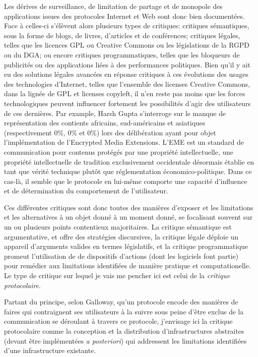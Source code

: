 \documentclass{article}
\begin{document}
Les dérives de surveillance, de limitation de partage et de monopole des applications issues des protocoles Internet et Web sont donc bien documentées. Face à celles-ci s'élèvent alors plusieurs types de critiques: critiques sémantiques, sous la forme de blogs, de livres, d'articles et de conférences; critiques légales, telles que les licences GPL ou Creative Commons\cite{elkin-koren_creative_2006} ou les législations de la RGPD ou du DGA; ou encore critiques programmatiques, telles que les bloqueurs de publicités\cite{gupta_block_2020} ou des applications liées à des performances politiques\cite{critical_art_ensemble_electronic_1996}. Bien qu'il y ait eu des solutions légales avancées en réponse critiques à ces évolutions des usages des technologies d'Internet, telles que l'ensemble des licenses Creative Commons, dans la lignée de GPL et licenses copyleft, il n'en reste pas moins que les forces technologiques peuvent influencer fortement les possibilités d'agir des utilisateurs de ces dernières. Par example, Harsh Gupta s'interroge sur le manque de représentation des contients africains, sud-américains et asiatiques (respectivement 0\%, 0\% et 0\%) lors des délibération ayant pour objet l'implémentation de l'Encrypted Media Extensions\cite{gupta_lack_2016}. L'EME est un standard de communication pour contenus protégés par une propriété intellectuelle, une propriété intellectuelle de tradition exclusivement occidentale désormais établie en tant que vérité technique plutôt que réglementation économico-politique. Dans ce cas-là, il semble que le protocole en lui-même comporte une capacité d'influence et de détermination du comportement de l'utilisateur.

Ces différentes critiques sont donc toutes des manières d'exposer et les limitations et les alternatives à un objet donné à un moment donné, se focalisant souvent sur un ou plusieurs points contentieux majoritaires. La critique sémantique est argumentative, et offre des stratégies discursives, la critique légale déploie un appareil d'arguments valides en termes législatifs, et la critique programmatique promeut l'utilisation de de dispositifs d'actions (dont les logiciels font partie) pour remédier aux limitations identifiées de manière pratique et computationelle. Le type de critique sur lequel je vais me pencher ici est celui de la \emph{critique protocolaire}.

Partant du principe, selon Galloway, qu'un protocole encode des manières de faires qui contraignent ses utilisateurs à la suivre sous peine d'être exclus de la communication se déroulant à travers ce protocole\cite{galloway_protocol_2004}, j'envisage ici la critique protocolaire comme la conception et la distribution d'infrastructures abstraites (devant être implémentées \emph{a posteriori}) qui addressent les limitations identifiées d'une infrastructure existante.
\end{document}
